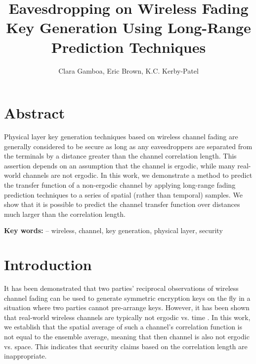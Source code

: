 \documentclass[11pt]{article} %
\title{Eavesdropping on Wireless Fading Key Generation Using Long-Range Prediction Techniques} %
\author{Clara Gamboa, Eric Brown, K.C. Kerby-Patel}  %
\begin{document}
\maketitle

\section{Abstract}

Physical layer key generation techniques based on wireless channel fading are generally considered to be secure as long as any eavesdroppers are separated from the terminals by a distance greater than the channel correlation length.  This assertion depends on an assumption that the channel is ergodic, while many real-world channels are not ergodic.  In this work, we demonstrate a method to predict the transfer function of a non-ergodic channel by applying long-range fading prediction techniques to a series of spatial (rather than temporal) samples.  We show that it is possible to predict the channel transfer function over distances much larger than the correlation length.  %

\textbf{Key words:} -- wireless, channel, key generation, physical layer, security

\section{Introduction}

It has been demonstrated \cite{anyPLkeygenpaper} that two parties' reciprocal observations of wireless channel fading can be used to generate symmetric encryption keys on the fly in a situation where two parties cannot pre-arrange keys. 
However, it has been shown that real-world wireless channels are typically not ergodic vs. time \cite{isukapalli}.  In this work, we establish that the spatial average of such a channel's correlation function is not equal to the ensemble average, meaning that then channel is also not ergodic vs. space.  This indicates that security claims based on the correlation length are inappropriate.  %
\end{document}
